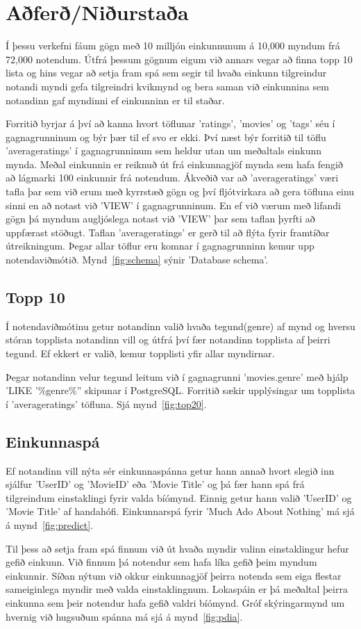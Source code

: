 \documentclass[11pt,a4paper]{amsart}
\theoremstyle{plain}
\theoremstyle{definition}
\theoremstyle{remark}
\begin{document}


\section{Aðferð/Niðurstaða}
Í þessu verkefni fáum gögn með 10 milljón einkunnunum á 10,000 myndum frá 72,000 notendum.
Útfrá þessum gögnum eigum við annars vegar að finna topp 10 lista og hins vegar að setja fram spá sem segir til hvaða einkunn tilgreindur notandi myndi gefa tilgreindri kvikmynd og bera saman við einkunnina sem notandinn gaf myndinni ef einkunninn er til staðar.  
\\\par
Forritið byrjar á því að kanna hvort töflunar 'ratings', 'movies' og 'tags' séu í gagnagrunninum og býr þær til ef svo er ekki. Því næst býr forritið til töflu 'averageratings' í gagnagrunninum sem heldur utan um meðaltals einkunn mynda. Meðal einkunnin er reiknuð út frá einkunnagjöf mynda sem hafa fengið að lágmarki 100 einkunnir frá notendum. Ákveðið var að 'averageratings' væri tafla þar sem við erum með kyrrstæð gögn og því fljótvirkara að gera töfluna einu sinni en að notast við 'VIEW' í gagnagrunninum. En ef við værum með lifandi gögn þá myndum augljóslega notast við 'VIEW' þar sem taflan þyrfti að uppfærast stöðugt. Taflan 'averageratings' er gerð til að flýta fyrir framtíðar útreikningum. Þegar allar töflur eru komnar í gagnagrunninn kemur upp notendaviðmótið. Mynd~\ref{fig:schema} sýnir 'Database schema'.

\subsection{Topp 10}
Í notendaviðmótinu getur notandinn valið hvaða tegund(genre) af mynd og hversu stóran topplista notandinn vill og útfrá því fær notandinn topplista af þeirri tegund. Ef ekkert er valið, kemur topplisti yfir allar myndirnar.\par Þegar notandinn velur tegund leitum við í gagnagrunni 'movies.genre' með hjálp 'LIKE '\%genre\%'' skipunar í PostgreSQL. Forritið sækir upplýsingar um topplista í 'averageratings' töfluna. Sjá mynd~\ref{fig:top20}.

\subsection{Einkunnaspá}
Ef notandinn vill nýta sér einkunnaspánna getur hann annað hvort slegið inn sjálfur 'UserID' og 'MovieID' eða 'Movie Title' og þá fær hann spá frá tilgreindum einstaklingi fyrir valda bíómynd. Einnig getur hann valið 'UserID' og 'Movie Title' af handahófi. Einkunnarspá fyrir 'Much Ado About Nothing' má sjá á mynd~\ref{fig:predict}.\par
Til þess að setja fram spá finnum við út hvaða myndir valinn einstaklingur hefur gefið einkunn. Við finnum þá notendur sem hafa líka gefið þeim myndum einkunnir. Síðan nýtum við okkur einkunnagjöf þeirra notenda sem eiga flestar sameiginlega myndir með valda einstaklingnum. Lokaspáin er þá meðaltal þeirra einkunna sem þeir notendur hafa gefið valdri bíómynd. Gróf skýringarmynd um hvernig við hugsuðum spánna má sjá á mynd~\ref{fig:pdia}.
\end{document}
